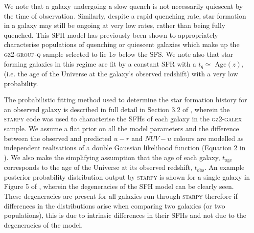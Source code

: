 \documentclass[useAMS,usenatbib]{mn2e}
\begin{document}
We note that a galaxy undergoing a slow quench is not necessarily quiescent by the time of observation. Similarly, despite a rapid quenching rate, star formation in a galaxy may still be ongoing at very low rates, rather than being fully quenched. This SFH model has previously been shown to appropriately characterise populations of quenching or quiescent galaxies \citep{Weiner06, Martin07, Noeske07,schawinski14} which make up the \textsc{gz2-group-q} sample selected to lie $1\sigma$ below the SFS. We note also that star forming galaxies in this regime are fit by a constant SFR with a $t_{q} \simeq$ Age$(z)$, (i.e. the age of the Universe at the galaxy's observed redshift) with a very low probability.


The probabilistic fitting method used to determine the star formation history for an observed galaxy is described in full detail in Section 3.2 of \cite{smethurst15}, wherein the \textsc{starpy} code was used to characterise the SFHs of each galaxy in the \textsc{gz2-galex} sample. We assume a flat prior on all the model parameters and the difference between the observed and predicted $u-r$ and $NUV-u$ colours are modelled as independent realisations of a double Gaussian likelihood function (Equation 2 in \citealt{smethurst15}). We also make the simplifying assumption that the age of each galaxy, $t_\mathrm{age}$ corresponds to the age of the Universe at its observed redshift, $t_\mathrm{obs}$. An example posterior probability distribution output by \textsc{starpy} is shown for a single galaxy in Figure 5 of \cite{smethurst15}, wherein the degeneracies of the SFH model can be clearly seen. These degeneracies are present for all galaxies run through \textsc{starpy} therefore if differences in the distributions arise when comparing two galaxies (or two populations), this is due to intrinsic differences in their SFHs and not due to the degeneracies of the model. 
\end{document}

